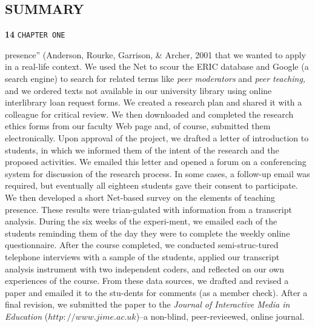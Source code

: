 \documentclass[8pt]{beamer}
\begin{document}
\begin{frame}
\section*{SUMMARY}
\begin{flushleft}
\textbf{14}\hspace*{1cm} \texttt{CHAPTER ONE}
\end{flushleft}

\vspace*{0.5cm}
\small{ presence'' (Anderson, Rourke, Garrison, \& Archer, 2001 that we wanted to apply in a real-life context. We used the Net to scour the ERIC database and Google  (a search engine) to search for related terms like \emph{peer moderators} and \emph{peer teaching,} and we ordered texts not available in our university library using online interlibrary loan request forms. We created a research plan and shared it with a colleague for critical review. We then downloaded  and completed the research ethics forms from our faculty Web page and, of course, submitted them electronically. Upon approval of the project, we drafted a letter of introduction to students, in which we informed them of the intent of the research and the proposed activities. We emailed this letter and opened a forum on a conferencing system for discussion of the research process. In some cases, a follow-up email was required, but eventually all eighteen students gave their consent to participate. We then developed a short Net-based survey on the elements of teaching presence. These results were trian-gulated with information from a transcript analysis. During the six weeks of the experi-ment, we emailed each of the students reminding them of the day they were to complete the weekly online questionnaire. After the course completed, we conducted semi-struc-tured telephone interviews with a sample of the students, applied our transcript analysis instrument with two independent coders, and reflected on our own experiences of the course. From these data sources, we drafted and revised a paper and emailed it to the stu-dents for comments (as a member check). After a final revision, we submitted the paper to the \emph{Journal of Interactive Media in Education} ($http://www.jime.ac.uk$)--a non-blind, peer-revieewed, online journal.}
\end{frame}
\end{document}
